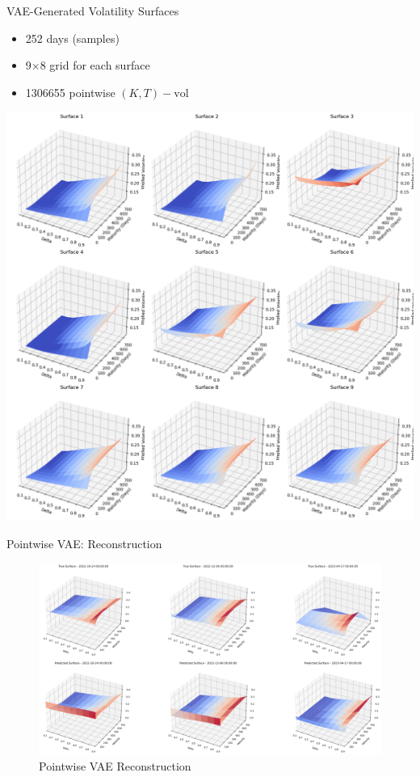 \documentclass{beamer}
\begin{document}
\begin{frame}{VAE-Generated Volatility Surfaces}
    \begin{minipage}{0.4\linewidth}
        \begin{itemize}
            \item 252 days (samples)
            \item 9×8 grid for each surface
            \item 1306655 pointwise $(K,T) - \text{vol}$
        \end{itemize}
    \end{minipage}%
    \hfill
    \begin{minipage}{0.6\linewidth}
        \centering
        \includegraphics[width=\linewidth]{docs/slides/img/vae_pw_ii_plot_from_5.png}
    \end{minipage}
\end{frame}

\begin{frame}{Pointwise VAE: Reconstruction}
\begin{figure}
    \centering
    \includegraphics[width=0.75\linewidth]{docs/slides/img/vae_pw_ii_recon.png}
    \caption{Pointwise VAE Reconstruction}
    \label{fig:enter-label}
\end{figure}

\end{frame}
\end{document}

